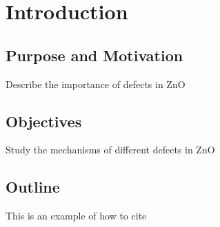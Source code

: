 \addchapheadtotoc
\chapter{Introduction}
\section{Purpose and Motivation}
Describe the importance of defects in ZnO
\section{Objectives}
Study the mechanisms of different defects in ZnO
\section{Outline}

This is an example of how to cite \citep{Prades2009}
